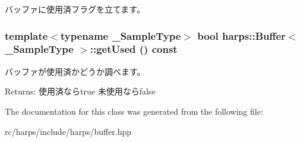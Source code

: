 バッファに使用済フラグを立てます。 
\subsubsection[getUsed]{\setlength{\rightskip}{0pt plus 5cm}template$<$typename \_\-SampleType$>$ bool {\bf harps::Buffer}$<$ \_\-SampleType $>$::getUsed () const\hspace{0.3cm}{\tt  [inline]}}\label{classharps_1_1Buffer_7d71d808b95592e23858926cc6fec561}


バッファが使用済かどうか調べます。 \begin{Desc}
\item[Returns:]使用済ならtrue 未使用ならfalse \end{Desc}


The documentation for this class was generated from the following file:\begin{CompactItemize}
\item 
rc/harps/include/harps/buffer.hpp\end{CompactItemize}
